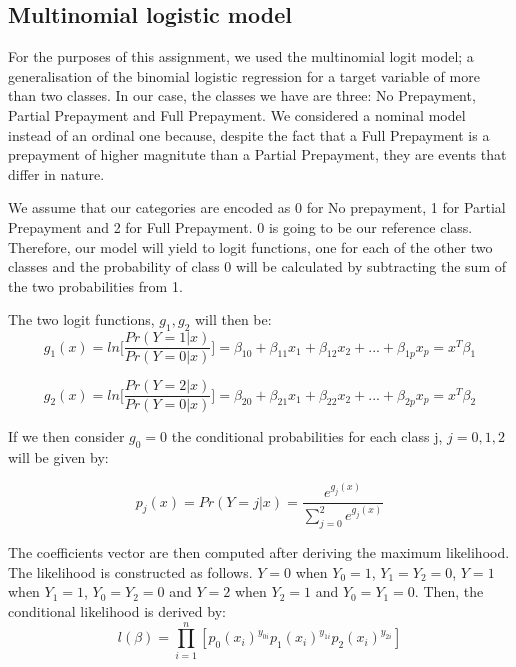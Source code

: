 \subsection{Multinomial logistic model}
    For the purposes of this assignment, we used the multinomial logit model; 
    a generalisation of the binomial logistic regression for a target 
    variable of more than two classes. In our case, the classes we have are three: No Prepayment, Partial Prepayment and Full Prepayment. We considered a nominal model instead of an ordinal one because, despite the fact that a Full Prepayment is a prepayment of higher magnitute than a Partial Prepayment, they are events that differ in nature. 
    
    We assume that our categories are encoded as 0 for No prepayment, 1 for Partial Prepayment and 2 for Full Prepayment. 0 is going to be our reference class. Therefore, our model will yield to logit functions, one for each of the other two classes and the probability of class 0 will be calculated by subtracting the sum of the two probabilities from 1.
    
    The two logit functions, $g_1, g_2$ will then be:
    \begin{equation}
        g_1(x) = ln\Big[\frac{Pr(Y=1|x)}{Pr(Y=0|x)}\Big] = \beta_{10} + \beta_{11}x_1 + \beta_{12}x_2 +...+ \beta_{1p}x_p = x^T\beta_1
    \end{equation}
    
    \begin{equation}
        g_2(x) = ln\Big[\frac{Pr(Y=2|x)}{Pr(Y=0|x)}\Big] = \beta_{20} + \beta_{21}x_1 + \beta_{22}x_2 +...+ \beta_{2p}x_p = x^T\beta_2
    \end{equation}
    
    If we then consider $g_0 = 0$ the conditional probabilities for each class j, $j=0,1,2$ will be given by:
    
    \begin{equation}
        p_j(x) = Pr(Y=j|x) = \frac{e^{g_j(x)}}{\sum_{j=0}^{2} e^{g_j(x)}}
    \end{equation}
    
    The coefficients vector are then computed after deriving the maximum likelihood. The likelihood is constructed as follows. $Y=0$ when $Y_0=1$, $Y_1=Y_2=0$, $Y=1$ when $Y_1=1$, $Y_0=Y_2=0$ and $Y=2$ when $Y_2=1$ and $Y_0=Y_1=0$. Then, the conditional likelihood is derived by:
    \begin{equation}
        l(\beta) = \prod_{i=1}^{n}[p_0(x_i)^{y_{0i}}p_1(x_i)^{y_{1i}}p_2(x_i)^{y_{2i}}] 
    \end{equation}
    

